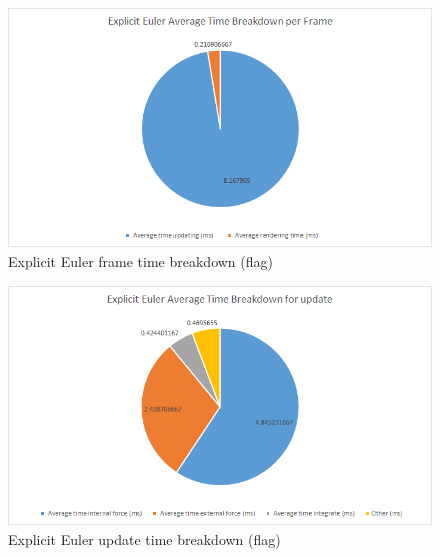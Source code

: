     \begin{figure}
    \begin{center}
      \includegraphics[scale=.9]{Figures/flag_ee_ft}
    \end{center}
    \caption{Explicit Euler frame time breakdown (flag)}
    \label{fig:ee ft flag}
  \end{figure}
  
    \begin{figure}
    \begin{center}
      \includegraphics[scale=.9]{Figures/flag_ee_ut}
    \end{center}
    \caption{Explicit Euler update time breakdown (flag)}
    \label{fig:ee ut flag}
  \end{figure}
  
